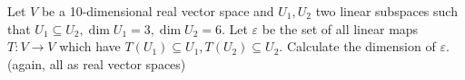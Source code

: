 Let $V$ be a 10-dimensional real vector space and $U_1,U_2$ two linear subspaces such that $U_1 \subseteq U_2, \dim U_1 =3, \dim U_2=6$. Let $\varepsilon$ be the set of all linear maps $T: V\rightarrow V$ which have $T(U_1)\subseteq U_1, T(U_2)\subseteq U_2$. Calculate the dimension of $\varepsilon$. (again, all as real vector spaces)